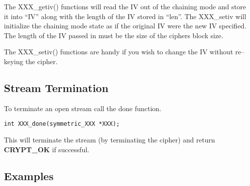 \documentclass[a4paper]{book}
\begin{document}
The XXX\_getiv() functions will read the IV out of the chaining mode and store it into ``IV'' along with the length of the IV 
stored in ``len''.  The XXX\_setiv will initialize the chaining mode state as if the original IV were the new IV specified.  The length
of the IV passed in must be the size of the ciphers block size.

The XXX\_setiv() functions are handy if you wish to change the IV without re--keying the cipher.  

\subsection{Stream Termination}
To terminate an open stream call the done function.

  
\begin{verbatim}
int XXX_done(symmetric_XXX *XXX);
\end{verbatim}

This will terminate the stream (by terminating the cipher) and return \textbf{CRYPT\_OK} if successful.

\subsection{Examples}
\end{document}
